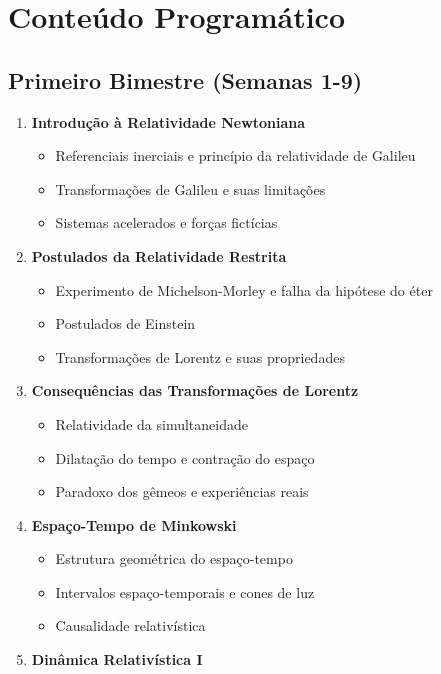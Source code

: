 \documentclass[a4paper,12pt]{article}
\begin{document}
\section{Conteúdo Programático}

\subsection*{Primeiro Bimestre (Semanas 1-9)}
\begin{enumerate}
	\item \textbf{Introdução à Relatividade Newtoniana}
	      \begin{itemize}
		      \item Referenciais inerciais e princípio da relatividade de Galileu
		      \item Transformações de Galileu e suas limitações
		      \item Sistemas acelerados e forças fictícias
	      \end{itemize}
	\item \textbf{Postulados da Relatividade Restrita}
	      \begin{itemize}
		      \item Experimento de Michelson-Morley e falha da hipótese do éter
		      \item Postulados de Einstein
		      \item Transformações de Lorentz e suas propriedades
	      \end{itemize}
	\item \textbf{Consequências das Transformações de Lorentz}
	      \begin{itemize}
		      \item Relatividade da simultaneidade
		      \item Dilatação do tempo e contração do espaço
		      \item Paradoxo dos gêmeos e experiências reais
	      \end{itemize}
	\item \textbf{Espaço-Tempo de Minkowski}
	      \begin{itemize}
		      \item Estrutura geométrica do espaço-tempo
		      \item Intervalos espaço-temporais e cones de luz
		      \item Causalidade relativística
	      \end{itemize}
	\item \textbf{Dinâmica Relativística I}
	      \begin{itemize}

\end{itemize}
\end{enumerate}
\end{document}
